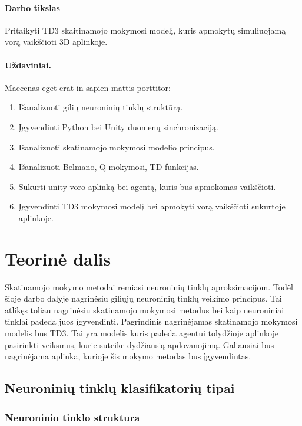 \documentclass[a4paper, 12pt]{article}
\begin{document}
\paragraph{Darbo tikslas} Pritaikyti TD3 skaitinamojo mokymosi modelį, kuris apmokytų simuliuojamą vorą vaikščioti 3D aplinkoje.
%
\paragraph{Uždaviniai.} Maecenas eget erat in sapien mattis porttitor:
%
\begin{enumerate}
  \addtolength{\itemsep}{-0.5\baselineskip} 
  \item Išanalizuoti gilių neuroninių tinklų struktūrą.
  \item Įgyvendinti Python bei Unity duomenų sinchronizaciją.
  \item Išanalizuoti skatinamojo mokymosi modelio principus.
  \item Išanalizuoti Belmano, Q-mokymosi, TD funkcijas.
  \item Sukurti unity voro aplinką bei agentą, kuris bus apmokomas vaikščioti.
  \item Įgyvendinti TD3 mokymosi modelį bei apmokyti vorą vaikščioti sukurtoje aplinkoje.
\end{enumerate}


%
%
\newpage



\section{Teorinė dalis}
%

Skatinamojo mokymo metodai remiasi neuroninių tinklų aproksimacijom. Todėl šioje darbo dalyje nagrinėsiu giliųjų neuroninių tinklų veikimo principus. Tai atlikęs toliau nagrinėsiu skatinamojo mokymosi metodus bei kaip neuroniniai tinklai padeda juos įgyvendinti. Pagrindinis nagrinėjamas skatinamojo mokymosi modelis bus TD3. Tai yra modelis kuris padeda agentui tolydžioje aplinkoje pasirinkti veiksmus, kurie suteike dydžiausią apdovanojimą. Galiausiai bus nagrinėjama aplinka, kurioje šis mokymo metodas bus įgyvendintas.

%
\subsection{Neuroninių tinklų klasifikatorių tipai}
%

%
\subsubsection{Neuroninio tinklo struktūra}
%
\end{document}
